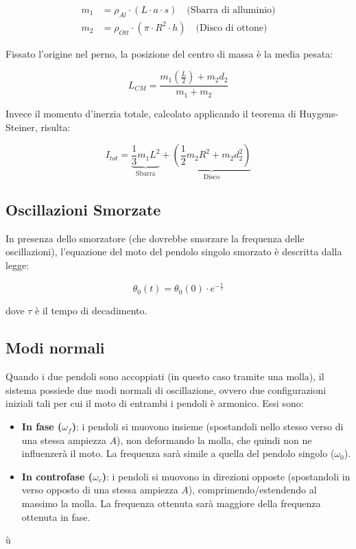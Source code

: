 \documentclass[a4paper,12pt]{article}
\begin{document}
\begin{align}
    m_{1} &= \rho_{Al} \cdot (L \cdot a \cdot s) \quad \text{(Sbarra di alluminio)}\label{eq:massa_1} \\
    m_{2} &= \rho_{Ott} \cdot (\pi \cdot R^2 \cdot h) \quad \text{(Disco di ottone)}\label{eq:massa_2}
\end{align}

Fissato l'origine nel perno, la posizione del centro di massa è la media pesata:

\begin{equation}
    L_{CM} = \frac{m_1 \left(\frac{L}{2}\right) + m_2 d_2}{m_1 + m_2}
    \label{eq:cm_medio}
\end{equation}

Invece il momento d'inerzia totale, calcolato applicando il teorema di Huygens-Steiner, risulta:

\begin{equation}
    I_{tot} = \underbrace{\frac{1}{3} m_1 L^2}_{\text{Sbarra}} + \underbrace{\left( \frac{1}{2} m_2 R^2 + m_2 d_2^2 \right)}_{\text{Disco}}
    \label{eq:momento_inerzia_tot}
\end{equation}

\subsection{Oscillazioni Smorzate}

In presenza dello smorzatore (che dovrebbe smorzare la frequenza delle oscillazioni), l'equazione del moto del pendolo singolo smorzato è descritta dalla legge:

\begin{equation}
    \theta_0(t) = \theta_0(0) \cdot e^{- \frac{t}{\tau}}  
    \label{eq:moto_pendolo_smorzato}
\end{equation}

dove $\tau$ è il tempo di decadimento.

\subsection{Modi normali}

Quando i due pendoli sono accoppiati (in questo caso tramite una molla), il sistema possiede due modi normali di oscillazione, ovvero due configurazioni iniziali tali per cui il moto di entrambi i pendoli è armonico. Essi sono:

\begin{itemize}
    \item \textbf{In fase ($\omega_f$)}: i pendoli si muovono insieme (spostandoli nello stesso verso di una stessa ampiezza $A$), non deformando la molla, che quindi non ne influenzerà il moto. La frequenza sarà simile a quella del pendolo singolo ($\omega_0$).
    \item \textbf{In controfase ($\omega_c$)}: i pendoli si muovono in direzioni opposte (spostandoli in verso opposto di una stessa ampiezza $A$), comprimendo/estendendo al massimo la molla. La frequenza ottenuta sarà maggiore della frequenza ottenuta in fase.
\end{itemize}ù
\end{document}
